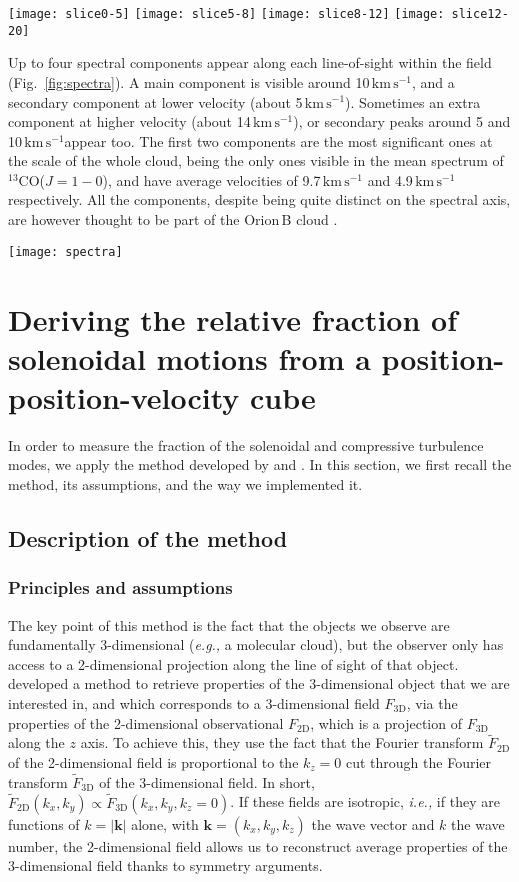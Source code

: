 \documentclass[structabstract]{aa}
\newcommand{\ie}{{\em i.e.,}}
\newcommand{\eg}{{\em e.g.,}}
\newcommand{\emm}[1]{\ensuremath{#1}}
\newcommand{\emr}[1]{\emm{\mathrm{#1}}}
\newcommand{\unit}[1]{\emr{\,#1}}
\newcommand{\kms}{\unit{km\,s^{-1}}}
\newcommand{\FigChannelMaps}{%
  \begin{figure*}
    \centering
    \texttt{[image: slice0-5]}
    \texttt{[image: slice5-8]}
    \texttt{[image: slice8-12]}
    \texttt{[image: slice12-20]}
    \caption{Maps of the average brightness temperature of the  $^{13}$CO($J=1-0$) line in four contiguous velocity ranges. The main-beam temperature scale is indicated by the color bar on the right. The contour shows the value of 8.9\,K\,\kms{} in the $W_0$ map, corresponding to 0.43\,K in the mean temperature map integrated over the -0.5 -- 20.5\kms{} velocity range. The set of coordinates used for the observational campaign takes the Horsehead PDR as a reference point, and aligns the IC\,434 PDR along the vertical axis (14$^\circ$ counter-clockwise rotation with respect to equatorial coordinates). The numbered squares in the first panel show the positions of the spectra presented in Fig.~\ref{fig:spectra}, from left to right.}
    \label{fig:channelmaps}
  \end{figure*}}
\newcommand{\FigSpectra}{%
  \begin{figure*}
    \centering
    \texttt{[image: spectra]}
    \caption{$^{13}$CO$(J=1-0)$ spectra along selected lines of sights in the Orion\,B cloud, showing the diversity of velocity components (up to four per spectrum). The coordinates of the various lines of sights are given in arc-minutes in our custom set of coordinates ($\delta$x, $\delta$y). The average spectrum for the whole field, normalized to have the same peak temperature, is superimposed with a dashed line for comparison. The position of the spectra on the map are shown by white squares in the first panel of Fig.~\ref{fig:channelmaps}.}
    \label{fig:spectra}
  \end{figure*}}
\begin{document}
\FigChannelMaps{} %

Up to four spectral components appear along each line-of-sight within the field (Fig.~\ref{fig:spectra}). A main component is visible around 10\kms, and a secondary component at lower velocity (about 5\kms). Sometimes an extra component at higher velocity (about 14\kms), or secondary peaks around 5 and 10\kms appear too. The first two components are the most significant ones at the scale of the whole cloud, being the only ones visible in the mean spectrum of $^{13}$CO($J=1-0$), and have average velocities of 9.7\kms{} and 4.9\kms{} respectively. All the components, despite being quite distinct on the spectral axis, are however thought to be part of the Orion\,B cloud \citep[see discussion in][]{pety16}.

\FigSpectra{} %


\section{Deriving the relative fraction of solenoidal motions from a position-position-velocity cube}

In order to measure the fraction of the solenoidal and compressive turbulence modes, we apply the method developed by \citet{brunt10} and \citet{brunt14}. In this section, we first recall the method, its assumptions, and the way we implemented it.
     
\subsection{Description of the method}
\subsubsection{Principles and assumptions}

The key point of this method is the fact that the objects we observe are fundamentally 3-dimensional (\eg{} a molecular cloud), but the observer only has access to a 2-dimensional projection along the line of sight of that object. \citet{brunt10} developed a method to retrieve properties of the 3-dimensional object that we are interested in, and which corresponds to a 3-dimensional field $F_\emr{3D}$, via the properties of the 2-dimensional observational $F_\emr{2D}$, which is a projection of $F_\emr{3D}$ along the $z$ axis. To achieve this, they use the fact that the Fourier transform $\tilde{F}_\emr{2D}$ of the 2-dimensional field is proportional to the $k_z = 0$ cut through the Fourier transform $\tilde{F}_\emr{3D}$ of the 3-dimensional field. In short, $\tilde{F}_\emr{2D}(k_x,k_y) \propto \tilde{F}_\emr{3D}(k_x,k_y,k_z = 0)$. If these fields are isotropic, \ie{} if they are functions of $k = |\mathbf{k}|$ alone, with $\mathbf{k} = (k_x,k_y,k_z)$ the wave vector and $k$ the wave number, the 2-dimensional field allows us to reconstruct average properties of the 3-dimensional field thanks to symmetry arguments.
\end{document}
